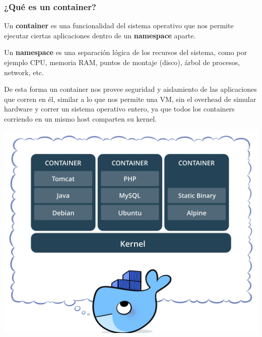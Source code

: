 \documentclass[xcolor={dvipsnames}]{beamer}
\begin{document}
\begin{frame}[fragile]
  \frametitle{¿Qué es un container?}
  \vspace{-0.8cm}
  \begin{multicols}{2}
  \justify
  	  \begin{spacing}{0.8}
	  \small Un \textbf{container} es una funcionalidad del sistema operativo que nos permite ejecutar ciertas aplicaciones dentro de un \textbf{namespace} aparte.

	  \vspace{0.25cm}

	  \small Un \textbf{namespace} es una separación lógica de los recursos del sistema, como por ejemplo CPU, memoria RAM, puntos de montaje (disco), árbol de procesos, network, etc.

	  \vspace{0.25cm}

	  \small De esta forma un container nos provee seguridad y aislamiento de las aplicaciones que corren en él, similar a lo que nos permite una VM, sin el overhead de simular hardware y correr un sistema operativo entero, ya que todos los containers corriendo en un mismo host comparten su kernel.
  	  \end{spacing}
  \columnbreak
  \vspace*{\fill}
  	\includegraphics[height=.6\textheight]{assets/containerz.png}
  \vspace*{\fill}
  \end{multicols}
\end{frame}
\end{document}
